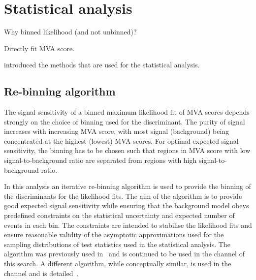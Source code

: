 \section{Statistical analysis}
\label{sec:statistical_analysis}


Why binned likelihood (and not unbinned)?

Directly fit MVA score.

 introduced the methods that are used
for the statistical analysis.



\subsection{Re-binning algorithm}
\label{sec:binning_alg}

The signal sensitivity of a binned maximum likelihood fit of
MVA scores depends strongly on the choice of binning used for the
discriminant. The purity of signal increases with increasing MVA
score, with most signal (background) being concentrated at the highest
(lowest) MVA scores. For optimal expected signal sensitivity, the
binning has to be chosen such that regions in MVA score with low
signal-to-background ratio are separated from regions with high
signal-to-background ratio.

In this analysis an iterative re-binning algorithm is used to provide
the binning of the discriminants for the likelihood fits. The aim of
the algorithm is to provide good expected signal sensitivity while
ensuring that the background model obeys predefined constraints on the
statistical uncertainty and expected number of events in each bin. The
constraints are intended to stabilise the likelihood fits and ensure
reasonable validity of the asymptotic approximations used for the
sampling distributions of test statistics used in the statistical
analysis. The algorithm was previously used
in~\cite{HIGG-2016-16-witherratum} and is continued to be used in the
\hadhad channel of this search. A different algorithm, while
conceptually similar, is used in the \lephad channel and is
detailed~\cite{ATLAS-CONF-2021-030}.

